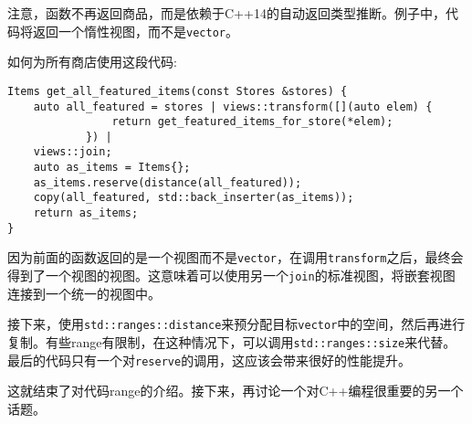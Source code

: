 注意，函数不再返回商品，而是依赖于C++14的自动返回类型推断。例子中，代码将返回一个惰性视图，而不是\texttt{vector}。

如何为所有商店使用这段代码:

\begin{lstlisting}[style=styleCXX]
Items get_all_featured_items(const Stores &stores) {
	auto all_featured = stores | views::transform([](auto elem) {
				return get_featured_items_for_store(*elem);
			}) |
	views::join;
	auto as_items = Items{};
	as_items.reserve(distance(all_featured));
	copy(all_featured, std::back_inserter(as_items));
	return as_items;
}
\end{lstlisting}

因为前面的函数返回的是一个视图而不是\texttt{vector}，在调用\texttt{transform}之后，最终会得到了一个视图的视图。这意味着可以使用另一个\texttt{join}的标准视图，将嵌套视图连接到一个统一的视图中。

接下来，使用\texttt{std::ranges::distance}来预分配目标\texttt{vector}中的空间，然后再进行复制。有些range有限制，在这种情况下，可以调用\texttt{std::ranges::size}来代替。最后的代码只有一个对\texttt{reserve}的调用，这应该会带来很好的性能提升。

这就结束了对代码range的介绍。接下来，再讨论一个对C++编程很重要的另一个话题。



